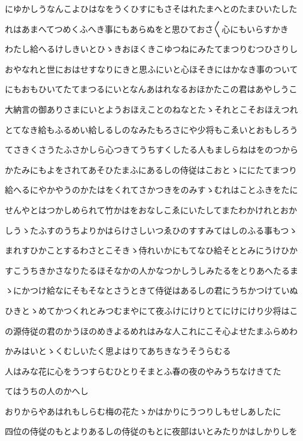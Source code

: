 \documentclass[a4paper,11pt,landscape]{ltjtarticle}
\begin{document}
にゆかしうなんこよひはなをうくひすにもさそはれたまへとのたまひいたした
\par\medskip
れはあまへてつめくふへき事にもあらぬをと思ひておさ〱心にもいらすかき
\par\medskip
わたし給へるけしきいとひゝきおほくきこゆつねにみたてまつりむつひさりし
\par\medskip
おやなれと世におはせすなりにきと思ふにいと心ほそきにはかなき事のついて
\par\medskip
にもおもひいてたてまつるにいとなんあはれなるおほかたこの君はあやしうこ
\par\medskip
大納言の御ありさまにいとようおほえことのねなとたゝそれとこそおほえつれ
\par\medskip
とてなき給もふるめい給しるしのなみたもろさにや少将もこゑいとおもしろう
\par\medskip
てさきくさうたふさかしら心つきてうちすくしたる人もましらねはをのつから
\par\medskip
かたみにもよをされてあそひたまふにあるしの侍従はこおとゝににたてまつり
\par\medskip
給へるにやかやうのかたはをくれてさかつきをのみすゝむれはことふきをたに
\par\medskip
せんやとはつかしめられて竹かはをおなしこゑにいたしてまたわかけれとおか
\par\medskip
しうゝたふすのうちよりかはらけさしいつゑひのすすみてはしのふる事もつゝ
\par\medskip
まれすひかことするわさとこそきゝ侍れいかにもてなひ給そととみにうけひか
\par\medskip
すこうちきかさなりたるほそなかの人かなつかしうしみたるをとりあへたるま
\par\medskip
ゝにかつけ給なにそもそなとさうときて侍従はあるしの君にうちかつけていぬ
\par\medskip
ひきとゝめてかつくれとみつむまやにて夜ふけにけりとてにけにけり少将はこ
\par\medskip
の源侍従の君のかうほのめきよるめれはみな人これにこそ心よせたまふらめわ
\par\medskip
かみはいとゝくむしいたく思よはりてあちきなうそうらむる
\par\medskip
人はみな花に心をうつすらむひとりそまとふ春の夜のやみうちなけきてた
\par\medskip
てはうちの人のかへし
\par\medskip
おりからやあはれもしらむ梅の花たゝかはかりにうつりしもせしあしたに
\par\medskip
四位の侍従のもとよりあるしの侍従のもとに夜部はいとみたりかはしかりしを
\par\medskip
\end{document}
